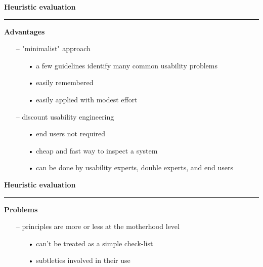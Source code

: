 \documentclass[pdf]{beamer}
\begin{document}
\begin{frame}
{\textbf{Heuristic evaluation}}{\textcolor{red}{\rule{12cm}{1.2pt}}}

    \textbf{Advantages}
    \begin{itemize}
    	\item[--] "minimalist" approach
        \begin{itemize}
        	\item[\textcolor{black}{•}] a few guidelines identify many common usability problems
            \item[\textcolor{black}{•}] easily remembered
            \item[\textcolor{black}{•}] easily applied with modest effort
        \end{itemize}
        \bigskip
        \item[--] discount usability engineering
        \begin{itemize}
        	\item[\textcolor{black}{•}] end users not required
            \item[\textcolor{black}{•}] cheap and fast way to inspect a system
            \item[\textcolor{black}{•}] can be done by usability experts, double experts, and end users
        \end{itemize}
    \end{itemize}
    \vspace{20px}
\end{frame}



\begin{frame}
{\textbf{Heuristic evaluation}}{\textcolor{red}{\rule{12cm}{1.2pt}}}

    \textbf{Problems}
    \begin{itemize}
    	\item[--] principles are more or less at the motherhood level
        \begin{itemize}
        	\item[\textcolor{black}{•}] can't be treated as a simple check-list
            \item[\textcolor{black}{•}] subtleties involved in their use
        \end{itemize}
    \end{itemize}
    \vspace{20px}
\end{frame}
\end{document}
